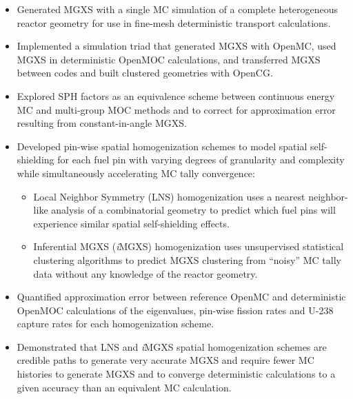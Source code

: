 \begin{emphbox}
\begin{itemize}
\item Generated \ac{MGXS} with a single \ac{MC} simulation of a complete heterogeneous reactor geometry for use in fine-mesh deterministic transport calculations.
\item Implemented a simulation triad that generated \ac{MGXS} with OpenMC, used \ac{MGXS} in deterministic OpenMOC calculations, and transferred \ac{MGXS} between codes and built clustered geometries with OpenCG.
\item Explored \ac{SPH} factors as an equivalence scheme between continuous energy \ac{MC} and multi-group \ac{MOC} methods and to correct for approximation error resulting from constant-in-angle \ac{MGXS}.
\item Developed pin-wise spatial homogenization schemes to model spatial self-shielding for each fuel pin with varying degrees of granularity and complexity while simultaneously accelerating \ac{MC} tally convergence:
\begin{itemize}
  \item Local Neighbor Symmetry (LNS) homogenization uses a nearest neighbor-like analysis of a combinatorial geometry to predict which fuel pins will experience similar spatial self-shielding effects.
  \item Inferential \ac{MGXS} (\textit{i}\ac{MGXS}) homogenization uses unsupervised statistical clustering algorithms to predict \ac{MGXS} clustering from ``noisy'' \ac{MC} tally data without any knowledge of the reactor geometry.
\end{itemize}
\item Quantified approximation error between reference OpenMC and deterministic OpenMOC calculations of the eigenvalues, pin-wise fission rates and U-238 capture rates for each homogenization scheme.
\item Demonstrated that \ac{LNS} and \textit{i}\ac{MGXS} spatial homogenization schemes are credible paths to generate very accurate \ac{MGXS} and require fewer \ac{MC} histories to generate \ac{MGXS} and to converge deterministic calculations to a given accuracy than an equivalent \ac{MC} calculation.
\end{itemize}
\end{emphbox}

